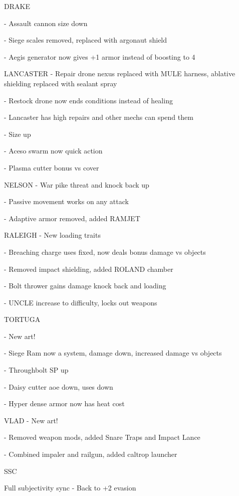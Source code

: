 DRAKE 
 
    -    Assault cannon size down
 

    -    Siege scales removed, replaced with argonaut shield
 
    -    Aegis generator now gives +1 armor instead of boosting to 4
 

LANCASTER   
    -    Repair drone nexus replaced with MULE harness, ablative shielding replaced with sealant spray
 
    -    Restock drone now ends conditions instead of healing
 
    -    Lancaster has high repairs and other mechs can spend them
 

    -    Size up
 
    -    Aceso swarm now quick action
 
    -    Plasma cutter bonus vs cover
 

NELSON   
    -    War pike threat and knock back up
 
    -    Passive movement works on any attack
 

    -    Adaptive armor removed, added RAMJET
 

RALEIGH   
    -    New loading traits
 

    -    Breaching charge uses fixed, now deals bonus damage vs objects
 
    -    Removed impact shielding, added ROLAND chamber
 
    -    Bolt thrower gains damage knock back and loading
 

    -    UNCLE increase to difficulty, locks out weapons
 

TORTUGA 
 
    -    New art!
 
    -    Siege Ram now a system, damage down, increased damage vs objects
 
    -    Throughbolt SP up
 

    -    Daisy cutter aoe down, uses down
 
    -    Hyper dense armor now has heat cost
 

VLAD   
    -    New art!
 
    -    Removed weapon mods, added Snare Traps and Impact Lance
 
    -    Combined impaler and railgun, added caltrop launcher
 

                                                        SSC  

Full subjectivity sync - Back to +2 evasion
 
